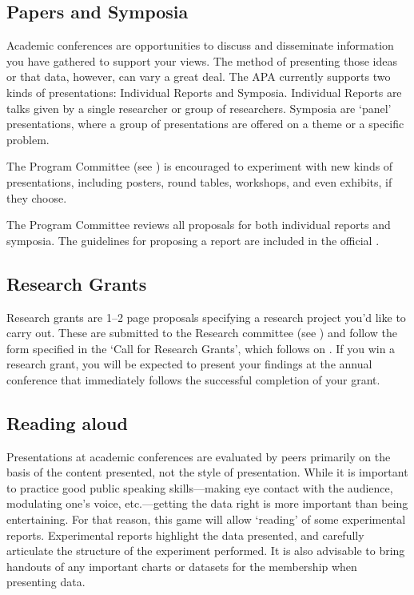 \begin{refsection}
\subsection{Papers and Symposia}
\label{papersandsymposia}

Academic conferences are opportunities to discuss and disseminate information you have gathered to support your views. The method of presenting those ideas or that data, however, can vary a great deal. The APA currently supports two kinds of presentations: Individual Reports and Symposia. Individual Reports are talks given by a single researcher or group of researchers. Symposia are `panel' presentations, where a group of presentations are offered on a theme or a specific problem.

The Program Committee (see ) is encouraged to experiment with new kinds of presentations, including posters, round tables, workshops, and even exhibits, if they choose. 

The Program Committee reviews all proposals for both individual reports and symposia. The guidelines for proposing a report are included in the official .

\subsection{Research Grants}
\label{researchgrants}

Research grants are 1--2 page proposals specifying a research project you'd like to carry out. These are submitted to the Research committee (see ) and follow the form specified in the ‘Call for Research Grants', which follows on . If you win a research grant, you will be expected to present your findings at the annual conference that immediately follows the successful completion of your grant.

\subsection{Reading aloud}
\label{readingaloud}

Presentations at academic conferences are evaluated by peers primarily on the basis of the content presented, not the style of presentation. While it is important to practice good public speaking skills---making eye contact with the audience, modulating one's voice, etc.---getting the data right is more important than being entertaining. For that reason, this game will allow `reading' of some experimental reports. Experimental reports highlight the data presented, and carefully articulate the structure of the experiment performed. It is also advisable to bring handouts of any important charts or datasets for the membership when presenting data. 


\end{refsection}

